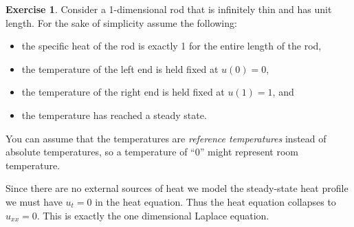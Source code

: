 \documentclass[
]{book}
\providecommand{\tightlist}{%
  \setlength{\itemsep}{0pt}\setlength{\parskip}{0pt}}
\theoremstyle{definition}
\theoremstyle{definition}
\theoremstyle{definition}
\newtheorem{exercise}{Exercise}[chapter]
\theoremstyle{remark}
\begin{document}
\begin{exercise}
\protect\hypertarget{exr:unnamed-chunk-598}{}{\label{exr:unnamed-chunk-598} }Consider a 1-dimensional rod that is infinitely thin and has unit length. For the sake of simplicity assume the following:

\begin{itemize}
\tightlist
\item
  the specific heat of the rod is exactly 1 for the entire length of the rod,
\item
  the temperature of the left end is held fixed at \(u(0) = 0\),
\item
  the temperature of the right end is held fixed at \(u(1) = 1\), and
\item
  the temperature has reached a steady state.
\end{itemize}

You can assume that the temperatures are \emph{reference temperatures} instead of absolute temperatures, so a temperature of ``0'' might represent room temperature.

Since there are no external sources of heat we model the steady-state heat profile we must have \(u_t = 0\) in the heat equation. Thus the heat equation collapses to \(u_{xx} = 0\). This is exactly the one dimensional Laplace equation.


\end{exercise}
\end{document}

